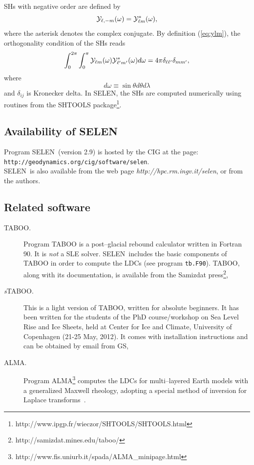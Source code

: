 \documentclass[11pt,fleqn,a4paper,titlepage]{article}
\newcommand\selen{\textsf{SELEN~}}
\newcommand\selens{\textsf{SELEN}}
\begin{document}
SHs with negative order are defined by
\begin{equation}\label{eq:ylm-negative-order}
{\cal Y}_{\ell, -m}(\omega) = {\cal Y}^\ast_{\ell m}(\omega),
\end{equation}
where the asterisk denotes the complex conjugate. By definition (\ref{eq:ylm}), the orthogonality 
condition of the SHs reads 
\begin{equation}
\int_{0}^{2\pi} \int_{0}^\pi {\cal Y}_{\ell m}(\omega) {\cal Y}^*_{\ell' m'}(\omega) d\omega =
4\pi \delta_{\ell \ell'}\delta_{mm'}, 
\end{equation}
where 
\begin{equation}
d\omega \equiv \sin \theta d\theta d\lambda
\end{equation}
and $\delta_{ij}$ is Kronecker delta. In \selens, the SHs are computed numerically 
using routines from the {SHTOOLS} package\footnote{http://www.ipgp.fr/wieczor/SHTOOLS/SHTOOLS.html}.

\subsection{Availability of SELEN}
Program \selen (version 2.9) is hosted by the CIG at the page: \texttt{http://geodynamics.org/cig/software/selen}. \\

\noindent \selen is also available from the web page \textit{http://hpc.rm.ingv.it/selen}, or from the authors. 

\subsection{Related software}
\begin{description}
\item[TABOO.] Program TABOO is a post--glacial rebound calculator written in Fortran 90. It is \textit{not} a SLE solver. \selen includes the basic components of TABOO in order to compute the LDCs (see program \texttt{tb.F90}). TABOO, along with its documentation, is available from the Samizdat press\footnote{http://samizdat.mines.edu/taboo/}, 
\item[\textit{s}TABOO.] This is a light version of TABOO, written for absolute beginners. It has been 
written for the students of the PhD course/workshop on Sea Level Rise and Ice Sheets,
held at Center for Ice and Climate, University of Copenhagen (21-25 May, 2012). It
comes with installation instructions and can be obtained by email from GS, 
\item[ALMA.] Program ALMA\footnote{http://www.fis.uniurb.it/spada/ALMA\_minipage.html} \citep{Spada_2008} computes the LDCs for multi--layered Earth models with a generalized Maxwell rheology, adopting a special method of inversion for Laplace transforms~\citep{Spada_and_Boschi_2006}. 
\end{description}
\end{document}
